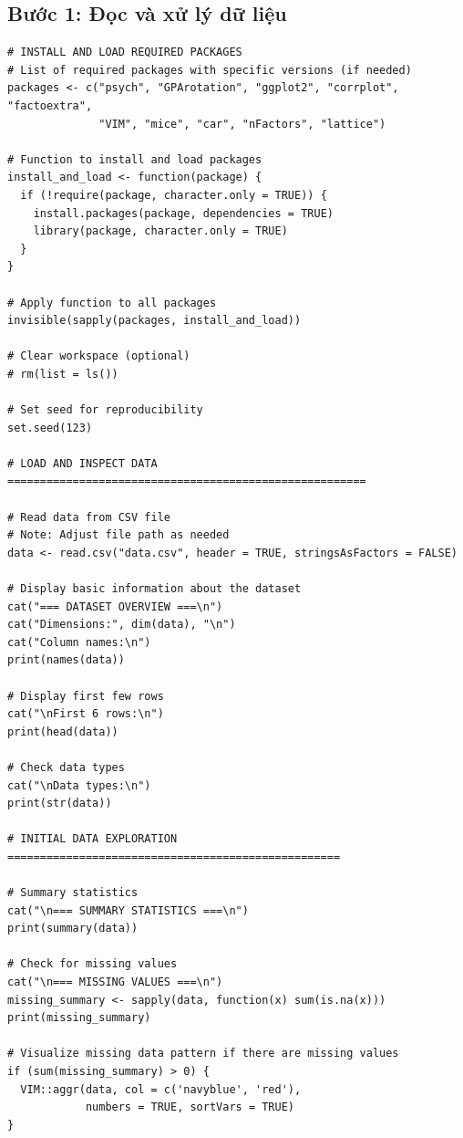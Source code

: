 \subsection{Bước 1: Đọc và xử lý dữ liệu}


\begin{lstlisting}[style=Rstyle, caption={Đọc dữ liệu vào để tiến hành phân tích dữ liệu}]
# INSTALL AND LOAD REQUIRED PACKAGES
# List of required packages with specific versions (if needed)
packages <- c("psych", "GPArotation", "ggplot2", "corrplot", "factoextra", 
              "VIM", "mice", "car", "nFactors", "lattice")

# Function to install and load packages
install_and_load <- function(package) {
  if (!require(package, character.only = TRUE)) {
    install.packages(package, dependencies = TRUE)
    library(package, character.only = TRUE)
  }
}

# Apply function to all packages
invisible(sapply(packages, install_and_load))

# Clear workspace (optional)
# rm(list = ls())

# Set seed for reproducibility
set.seed(123)

# LOAD AND INSPECT DATA =======================================================

# Read data from CSV file
# Note: Adjust file path as needed
data <- read.csv("data.csv", header = TRUE, stringsAsFactors = FALSE)

# Display basic information about the dataset
cat("=== DATASET OVERVIEW ===\n")
cat("Dimensions:", dim(data), "\n")
cat("Column names:\n")
print(names(data))

# Display first few rows
cat("\nFirst 6 rows:\n")
print(head(data))

# Check data types
cat("\nData types:\n")
print(str(data))

# INITIAL DATA EXPLORATION ===================================================

# Summary statistics
cat("\n=== SUMMARY STATISTICS ===\n")
print(summary(data))

# Check for missing values
cat("\n=== MISSING VALUES ===\n")
missing_summary <- sapply(data, function(x) sum(is.na(x)))
print(missing_summary)

# Visualize missing data pattern if there are missing values
if (sum(missing_summary) > 0) {
  VIM::aggr(data, col = c('navyblue', 'red'), 
            numbers = TRUE, sortVars = TRUE)
}


\end{lstlisting}

